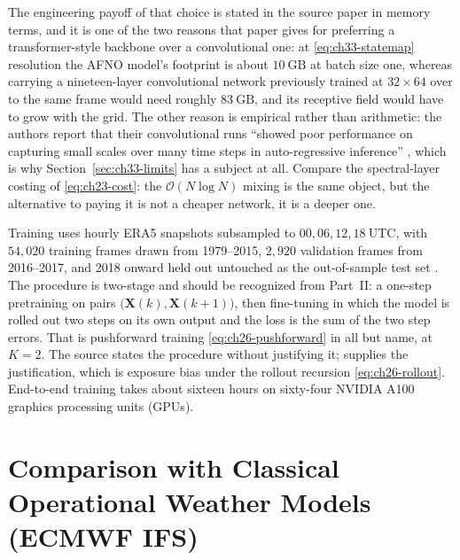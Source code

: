 The engineering payoff of that choice is stated in the source paper in memory terms, and it
is one of the two reasons that paper gives for preferring a transformer-style backbone over a
convolutional one: at \eqref{eq:ch33-statemap} resolution the AFNO model's footprint is about
$10\ \mathrm{GB}$ at batch size one, whereas carrying a nineteen-layer convolutional network
previously trained at $32 \times 64$ over to the same frame would need roughly
$83\ \mathrm{GB}$, and its receptive field would have to grow with the grid. The other reason
is empirical rather than arithmetic: the authors report that their convolutional runs
``showed poor performance on capturing small scales over many time steps in auto-regressive
inference'' \cite{pathak2022fourcastnet}, which is why Section~\ref{sec:ch33-limits} has a
subject at all. Compare the spectral-layer costing of \eqref{eq:ch23-cost}: the
$\mathcal{O}(N\log N)$ mixing is the same object, but the alternative to paying it is not a
cheaper network, it is a deeper one.

Training uses hourly ERA5 snapshots subsampled to $00, 06, 12, 18\ \mathrm{UTC}$, with
$54{,}020$ training frames drawn from 1979--2015, $2{,}920$ validation frames from
2016--2017, and 2018 onward held out untouched as the out-of-sample test
set \cite{pathak2022fourcastnet}. The procedure is two-stage and should be
recognized from Part~II: a one-step pretraining on pairs
$\big(\mathbf{X}(k),\mathbf{X}(k+1)\big)$, then fine-tuning in which the model is rolled out
two steps on its own output and the loss is the sum of the two step errors. That is
pushforward training \eqref{eq:ch26-pushforward} in all but name, at $K=2$. The source states
the procedure without justifying it;
 supplies the justification,
which is exposure bias under the rollout recursion \eqref{eq:ch26-rollout}. End-to-end
training takes about sixteen hours on sixty-four NVIDIA A100 graphics processing units
(GPUs).

\section{Comparison with Classical Operational Weather Models (ECMWF IFS)}
\label{sec:ch33-verification}

